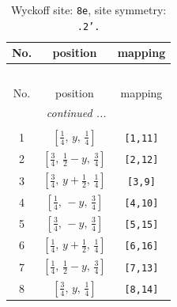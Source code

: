 \documentclass[fleqn,8pt]{jsarticle}
\begin{document}
\begin{longtable}{ccc}
\caption{Wyckoff site: {\tt 8e}, site symmetry: {\tt .2'.}}
 \\
 \hline \hline
No. & position & mapping \\ \hline \endfirsthead

\multicolumn{2}{l}{\tablename\ \thetable{}} \\
 \hline \hline
No. & position & mapping \\ \hline \endhead

 \hline \hline
\multicolumn{2}{r}{\footnotesize\it continued ...} \\ \endfoot

 \hline \hline
\multicolumn{2}{r}{} \\ \endlastfoot

1 & $\left[ \frac{1}{4},\, y,\, \frac{1}{4} \right]$ & {\tt [1,11]} \\ \hline
2 & $\left[ \frac{3}{4},\, \frac{1}{2} - y,\, \frac{3}{4} \right]$ & {\tt [2,12]} \\ \hline
3 & $\left[ \frac{3}{4},\, y + \frac{1}{2},\, \frac{1}{4} \right]$ & {\tt [3,9]} \\ \hline
4 & $\left[ \frac{1}{4},\, - y,\, \frac{3}{4} \right]$ & {\tt [4,10]} \\ \hline
5 & $\left[ \frac{3}{4},\, - y,\, \frac{3}{4} \right]$ & {\tt [5,15]} \\ \hline
6 & $\left[ \frac{1}{4},\, y + \frac{1}{2},\, \frac{1}{4} \right]$ & {\tt [6,16]} \\ \hline
7 & $\left[ \frac{1}{4},\, \frac{1}{2} - y,\, \frac{3}{4} \right]$ & {\tt [7,13]} \\ \hline
8 & $\left[ \frac{3}{4},\, y,\, \frac{1}{4} \right]$ & {\tt [8,14]} \\
\end{longtable}
\renewcommand{\arraystretch}{1.2}
\end{document}
